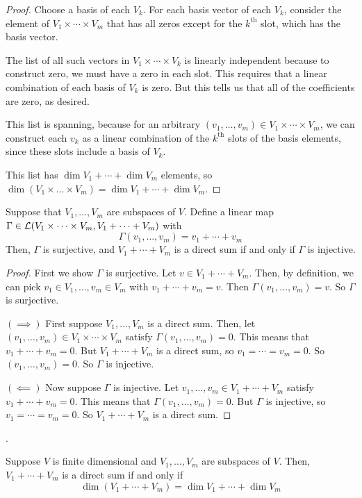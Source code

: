 \begin{proof}
    Choose a basis of each $V_k$. For each basis vector of each $V_k$, consider the element of $V_1\times \cdots\times V_m$ that has all zeros except for the $k^\text{th}$ slot, which has the basis vector. 
    
    The list of all such vectors in $V_1\times \cdots\times V_k$ is linearly independent because to construct zero, we must have a zero in each slot. This requires that a linear combination of each basis of $V_k$ is zero. But this tells us that all of the coefficients are zero, as desired.

    This list is spanning, because for an arbitrary $(v_1, \dots, v_m)\in V_1\times \cdots \times V_m$, we can construct each $v_k$ as a linear combination of the $k^\text{th}$ slots of the basis elements, since these slots include a basis of $V_k$.

    This list has $\dim V_1 + \cdots + \dim V_m$ elements, so $\dim(V_1 \times \dots\times V_m) = \dim V_1 + \cdots + \dim V_m$.
\end{proof}
\begin{theorem}
    Suppose that $V_1, \dots, V_m$ are subspaces of $V$. Define a linear map $\Gamma \in \mathcal{L}(V_1\times\cdots\times V_m, V_1 + \cdots + V_m)$ with
    \[ \Gamma(v_1, \dots, v_m) = v_1 + \cdots + v_m \]
    Then, $\Gamma$ is surjective, and $V_1 + \cdots + V_m$ is a direct sum if and only if $\Gamma$ is injective.
\end{theorem}
\begin{proof}
    First we show $\Gamma$ is surjective. Let $v \in V_1 + \cdots + V_m$. Then, by definition, we can pick $v_1\in V_1, \dots, v_m \in V_m$ with $v_1 + \cdots + v_m = v$. Then $\Gamma(v_1, \dots, v_m) = v$. So $\Gamma$ is surjective.
    
    $(\implies)$ First suppose $V_1, \dots, V_m$ is a direct sum. Then, let $(v_1, \dots, v_m) \in V_1 \times\cdots\times V_m$ satisfy $\Gamma(v_1, \dots, v_m) =0$. This means that $v_1 + \cdots + v_m = 0$. But $V_1 + \cdots + V_m$ is a direct sum, so $v_1 = \cdots = v_m = 0$. So $(v_1, \dots, v_m) = 0$. So $\Gamma$ is injective.

    $(\impliedby)$ Now suppose $\Gamma$ is injective. Let $v_1, \dots, v_m \in V_1 + \cdots + V_m$ satisfy $v_1 + \cdots + v_m = 0$. This means that $\Gamma(v_1, \dots, v_m) = 0$. But $\Gamma$ is injective, so $v_1 = \cdots = v_m = 0$. So $V_1 + \cdots + V_m$ is a direct sum.
\end{proof}
.
\begin{theorem}
    Suppose $V$ is finite dimensional and $V_1, \dots, V_m$ are subspaces of $V$. Then, $V_1 + \cdots + V_m$ is a direct sum if and only if
    \[ \dim(V_1 + \cdots + V_m) = \dim V_1 + \cdots + \dim V_m\]
\end{theorem}
